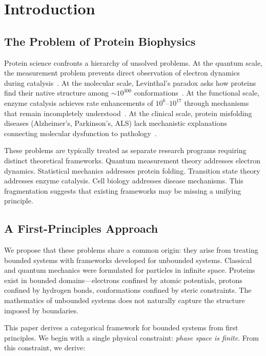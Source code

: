 \documentclass[twocolumn,aps,prx,superscriptaddress,longbibliography]{revtex4-2}
\theoremstyle{remark}
\begin{document}
\section{Introduction}
\label{sec:introduction}

\subsection{The Problem of Protein Biophysics}

Protein science confronts a hierarchy of unsolved problems. At the quantum
scale, the measurement problem prevents direct observation of electron
dynamics during catalysis~\cite{Heisenberg1927}. At the molecular scale,
Levinthal's paradox asks how proteins find their native structure among
$\sim 10^{300}$ conformations~\cite{levinthal1969fold}. At the functional
scale, enzyme catalysis achieves rate enhancements of $10^{6}$--$10^{17}$
through mechanisms that remain incompletely understood~\cite{Wolfenden1999}.
At the clinical scale, protein misfolding diseases (Alzheimer's, Parkinson's,
ALS) lack mechanistic explanations connecting molecular dysfunction to
pathology~\cite{Chiti2017}.

These problems are typically treated as separate research programs requiring
distinct theoretical frameworks. Quantum measurement theory addresses electron
dynamics. Statistical mechanics addresses protein folding. Transition state
theory addresses enzyme catalysis. Cell biology addresses disease mechanisms.
This fragmentation suggests that existing frameworks may be missing a unifying
principle.

\subsection{A First-Principles Approach}

We propose that these problems share a common origin: they arise from treating
bounded systems with frameworks developed for unbounded systems. Classical and
quantum mechanics were formulated for particles in infinite space. Proteins
exist in bounded domains---electrons confined by atomic potentials, protons
confined by hydrogen bonds, conformations confined by steric constraints.
The mathematics of unbounded systems does not naturally capture the structure
imposed by boundaries.

This paper derives a categorical framework for bounded systems from first
principles. We begin with a single physical constraint: \textit{phase space
is finite}. From this constraint, we derive:
\end{document}

